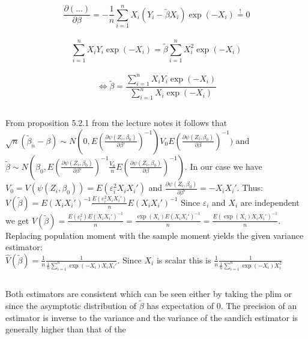 \documentclass[11pt]{article}
\theoremstyle{break}
\begin{document}
$$\frac{\partial (...)}{\partial \beta} = -\frac{1}{n} \displaystyle \sum_{i=1}^n X_i(Y_i-\tilde{\beta} X_i)\exp(-X_i)\stackrel{!}{=}0$$ \\
$$\displaystyle \sum_{i=1}^nX_iY_i\exp(-X_i) = \tilde{\beta} \displaystyle \sum_{i=1}^nX_i^2\exp(-X_i)$$ \\
$$\Leftrightarrow \tilde{\beta} = \frac{\displaystyle \sum_{i=1}^n X_iY_i\exp(-X_i)}{\displaystyle \sum_{i=1}^nX_i\exp(-X_i)}$$

\subsection{}
From proposition 5.2.1 from the lecture notes it follows that $\sqrt{n}(\tilde{\beta}_n-\beta) \sim N(0, E(\frac{\partial \psi(Z_i, \beta_0)}{\partial \beta'})^{-1})V_0 E(\frac{\partial \psi(Z_i, \beta_0)}{\partial \beta})^{-1})$
and $\tilde{\beta} \sim N(\beta_0, E(\frac{\partial \psi(Z_i, \beta_0)}{\partial \beta'})^{-1}\frac{V_0}{n} E(\frac{\partial \psi(Z_i, \beta_0)}{\partial \beta})^{-1})$. In our case we have $V_0 = V(\psi(Z_i, \beta_0)) = E(\varepsilon_i^2X_iX_i')$ and $\frac{\partial \psi(Z_i, \beta_0)}{\partial \beta'} = -X_iX_i'$. Thus: \\
$V(\tilde{\beta}) = E(X_iX_i')^{-1}\frac{E(\varepsilon_i^2X_iX_i')}{n}E(X_iX_i')^{-1}$ Since $\varepsilon_i$ and $X_i$ are independent we get $V(\tilde{\beta}) = \frac{E(\varepsilon_i^2)E(X_iX_i')^{-1}}{n} = \frac{\exp(X_i)E(X_iX_i')^{-1}}{n} = \frac{E(\exp(X_i)X_iX_i')^{-1}}{n}$. Replacing population moment with the sample moment yields the given variance estimator: \\
$\hat{V}(\tilde{\beta}) = \frac{1}{n}\frac{1}{\frac{1}{n} \sum_{i=1}^n\exp(-X_i)X_iX_i'}$. Since $X_i$ is scalar this is $\frac{1}{n}\frac{1}{\frac{1}{n} \sum_{i=1}^n\exp(-X_i)X_i^2}$

\subsection{}
Both estimators are consistent which can be seen either by taking the plim or since the asymptotic distribution of $\tilde{\beta}$ has expectation of 0. The precision of an estimator is inverse to the variance and the variance of the sandich estimator is generally higher than that of the 
\end{document}
